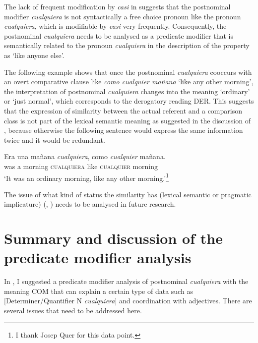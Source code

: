 {The lack of frequent modification by \textit{casi} in  suggests that the postnominal modifier \textit{cualquiera} is not syntactically a free choice pronoun like the pronoun \textit{cualquiera}, which is modifiable by \textit{casi} very frequently. Consequently, the postnominal \textit{cualquiera} needs to be analysed as a predicate modifier that is semantically related to the pronoun \textit{cualquiera} in the description of the property as ‘like anyone else’.

The following example shows that once the postnominal \textit{cualquiera} cooccurs with an overt comparative clause like \textit{como cualquier mañana} ‘like any other morning’, the interpretation of postnominal \textit{cualquiera} changes into the meaning ‘ordinary’ or ‘just normal’, which corresponds to the derogatory reading DER. This suggests that the expression of similarity between the actual referent and a comparison class is not part of the lexical semantic meaning as suggested in the discussion of , because otherwise the following sentence would express the same information twice and it would be redundant.

\ea \label{ex:key:177} %
\gll Era una mañana \textit{cualquiera}, como \textit{cualquier} mañana.\\
was a morning \textsc{cualquiera} like \textsc{cualquier} morning\\
\glt ‘It was an ordinary morning, like any other morning.’\footnote{{I thank Josep Quer for this data point.} }
\z

The issue of what kind of status the similarity has (lexical semantic or pragmatic implicature) (\citealt{Aloni2021}, \citealt{am2018}) needs to be analysed in future research.

\section{{Summary} {and} {discussion} {of} {the} {predicate} {modifier} {analysis}} \label{sec:3.4}

In , I suggested a predicate modifier analysis of postnominal \textit{cualquiera} with the meaning COM that can explain a certain type of data such as [Determiner/Quantifier N \textit{cualquiera}] and coordination with adjectives. There are several issues that need to be addressed here.

}
